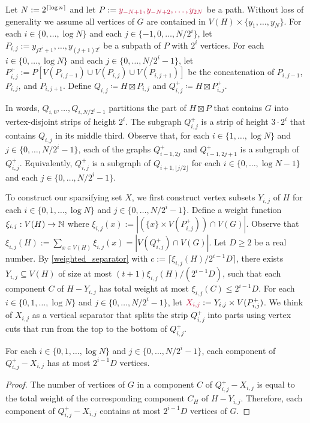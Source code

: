 \documentclass{patmorin}
\makeatletter
\renewcommand{\ge}{\geqslant}
\renewcommand{\le}{\leqslant}
\def\mathcolor#1#{\@mathcolor{#1}}
\def\@mathcolor#1#2#3{%
  \protect\leavevmode
  \begingroup
    \color#1{#2}#3%
  \endgroup
}
\newcommand{\mathdefin}[1]{\mathcolor{brightmaroon}{#1}}
\makeatother
\begin{document}
Let $N:=2^{{\lceil \log n \rceil}}$ and let $P:=\mathdefin{y_{-N+1},y_{-N+2},\ldots,y_{2N}}$ be a path.  Without loss of generality we assume all vertices of $G$ are contained in $V(H)\times\{y_1,\ldots,y_N\}$.  For each $i\in\{0,\ldots,\log N\}$ and each $j\in\{-1,0,\ldots,N/2^{i}\}$, let $P_{i,j}:=y_{j2^i+1},\ldots,y_{(j+1)2^i}$ be a subpath of $P$ with $2^i$ vertices. For each $i\in\{0,\ldots,\log N\}$ and each $j\in\{0,\ldots,N/2^{i}-1\}$, let $P^+_{i,j}:=P[V(P_{i,j-1})\cup V(P_{i,j})\cup V(P_{i,j+1})]$ be the concatenation of $P_{i,j-1}$, $P_{i,j}$, and $P_{i,j+1}$. Define $Q_{i,j}\coloneqq H\boxtimes P_{i,j}$ and $Q^+_{i,j}\coloneqq H\boxtimes P^+_{i,j}$.

In words, $Q_{i,0},\ldots,Q_{i,N/2^i-1}$ partitions the part of $H\boxtimes P$ that contains $G$ into vertex-disjoint strips of height $2^i$. The subgraph $Q^+_{i,j}$ is a strip of height $3\cdot 2^i$ that contains $Q_{i,j}$ in its middle third.  Observe that, for each $i\in\{1,\ldots,\log N\}$ and $j\in\{0,\ldots,N/2^i-1\}$, each of the graphs $Q^+_{i-1,2j}$ and $Q^+_{i-1,2j+1}$ is a subgraph of $Q^+_{i,j}$. Equivalently, $Q^+_{i,j}$ is a subgraph of $Q_{i+1,\lfloor j/2\rfloor}$ for each $i\in\{0,\ldots,\log N-1\}$ and each $j\in\{0,\ldots,N/2^i-1\}$.

To construct our sparsifying set $X$, we first construct vertex subsets $Y_{i,j}$ of $H$ for each $i\in\{0,1,\ldots,\log N\}$ and $j\in\{0,\ldots,N/2^{i}-1\}$.  Define a weight function $\xi_{i,j}:V(H)\to\mathbb{N}$ where $\xi_{i,j}(x):=|(\{x\}\times V(P^+_{i,j})) \cap V(G)|$.  Observe that $\xi_{i,j}(H):=\sum_{x\in V(H)} \xi_{i,j}(x)=|V(Q^+_{i,j})\cap V(G)|$. Let $D\ge 2$ be a real number.  By \cref{weighted_separator} with $c:=\lceil\xi_{i,j}(H)/2^{i-1}D\rceil$, there exists $Y_{i,j}\subseteq V(H)$ of size at most $(t+1)\xi_{i,j}(H)/(2^{i-1}D)$, such that each component $C$ of $H-Y_{i,j}$ has total weight at most $\xi_{i,j}(C)\le 2^{i-1}D$.  For each $i\in\{0,1,\ldots,\log N\}$ and $j\in\{0,\ldots,N/2^{i}-1\}$, let $\mathdefin{X_{i,j}}:=Y_{i,j}\times V(P^+_{i,j})$.  We think of $X_{i,j}$ as a vertical separator that splits the strip $Q^+_{i,j}$ into parts using vertex cuts that run from the top to the bottom of $Q^+_{i,j}$.

\begin{lem}
  For each $i\in\{0,1,\ldots,\log N\}$ and $j\in\{0,\ldots,N/2^{i}-1\}$, each component of $Q^+_{i,j}-X_{i,j}$ has at most $2^{i-1}D$ vertices.\
\end{lem}

\begin{proof}
  The number of vertices of $G$ in a component $C$ of $Q^+_{i,j}-X_{i,j}$ is equal to the total weight of the corresponding component $C_H$ of $H-Y_{i,j}$.  Therefore, each component of $Q^+_{i,j}-X_{i,j}$ contains at most $2^{i-1}D$ vertices of $G$.
\end{proof}
\end{document}
